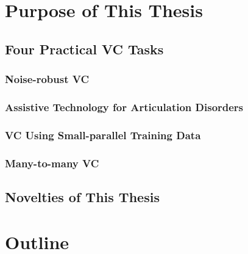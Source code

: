 \section{Purpose of This Thesis} 

\subsection{Four Practical VC Tasks} 
\subsubsection{Noise-robust VC} 

\subsubsection{Assistive Technology for Articulation Disorders} 

\subsubsection{VC Using Small-parallel Training Data} 

\subsubsection{Many-to-many VC} 

\subsection{Novelties of This Thesis} 

\section{Outline} 

